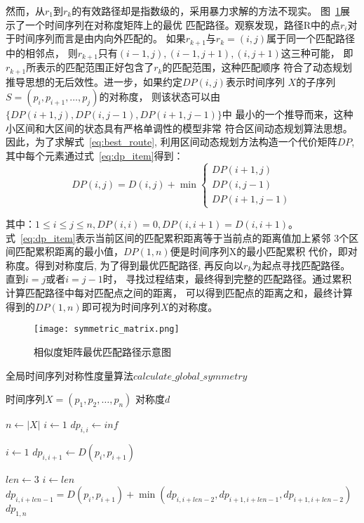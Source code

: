 然而，从$r_1$到$r_k$的有效路径却是指数级的，采用暴力求解的方法不现实。
图~\ref{fig:symmetric_matrix}展示了一个时间序列在对称度矩阵上的最优
匹配路径。观察发现，路径R中的点$r_i$对于时间序列而言是由内向外匹配的。
如果$r_{k+1}$与$r_k=\left(i,j\right)$属于同一个匹配路径中的相邻点，
则$r_{k+1}$只有$(i-1, j),(i-1, j+1),(i, j+1)$这三种可能，
即$r_{k+1}$所表示的匹配范围正好包含了$r_k$的匹配范围，这种匹配顺序
符合了动态规划推导思想的无后效性。进一步，如果约定$D P(i, j)$表示时间序列
$X$的子序列$S=\left(p_{i}, p_{i+1}, \dots, p_{j}\right)$的对称度，
则该状态可以由$\{D P(i+1, j), D P(i, j-1), D P(i+1, j-1)\}$中
最小的一个推导而来，这种小区间和大区间的状态具有严格单调性的模型非常
符合区间动态规划算法思想。因此，为了求解式~\ref{eq:best_route},
利用区间动态规划方法构造一个代价矩阵$DP$, 其中每个元素通过式~\ref{eq:dp_item}得到：
\begin{equation}
  D P(i, j)=D(i, j)+\min \left\{\begin{array}{c}
    D P(i+1, j) \\
    D P(i, j-1) \\
    D P(i+1, j-1)
  \end{array}\right.
  \label{eq:dp_item}
\end{equation}

其中：$1 \leq i \leq j \leq n, D P(i, i)=0, D P(i, i+1)=D(i, i+1)$。
式~\ref{eq:dp_item}表示当前区间的匹配累积距离等于当前点的距离值加上紧邻
3个区间匹配累积距离的最小值，$D P(1, n)$便是时间序列X的最小匹配累积
代价，即对称度。得到对称度后, 为了得到最优匹配路径,
再反向以$r_k$为起点寻找匹配路径。直到$i=j$或者$i=j-1$时，
寻找过程结束，最终得到完整的匹配路径。通过累积计算匹配路径中每对匹配点之间的距离，
可以得到匹配点的距离之和，最终计算得到的$DP(1,n)$即可视为时间序列$X$的对称度。
\begin{figure}
  \centering
  \texttt{[image: symmetric\_matrix.png]}
  \caption{相似度矩阵最优匹配路径示意图}
  \label{fig:symmetric_matrix}
\end{figure}

\renewcommand{\algorithmicrequire}{\textbf{输入：}\unskip}
\renewcommand{\algorithmicensure}{\textbf{输出：}\unskip}

\begin{algorithm}
  \caption{全局时间序列对称性度量算法$calculate\_global\_symmetry$}
  \label{alg:global_symmetry}
  \small
  \begin{algorithmic}
    \REQUIRE 时间序列$X=\left(p_{1}, p_{2}, \dots, p_{n}\right)$
    \ENSURE 对称度$d$

    \STATE $n \leftarrow \left|X\right|$
    \STATE $i \leftarrow 1$
    \STATE $dp_{i,i} \leftarrow inf$
    \ENDWHILE

    \STATE $i \leftarrow 1$
    \STATE $dp_{i,i+1} \leftarrow D\left(p_{i}, p_{i+1}\right)$
    \ENDWHILE

    \STATE $len \leftarrow 3$
    \STATE $i \leftarrow len$
    \STATE $dp_{i,i+len-1} = D\left(p_{i}, p_{i+1}\right)+\min \left(dp_{i,i+len-2},dp_{i+1,i+len-1},dp_{i+1,i+len-2}\right)$
    \ENDWHILE
    \ENDWHILE
    \RETURN $dp_{1,n}$
  \end{algorithmic}
\end{algorithm}

